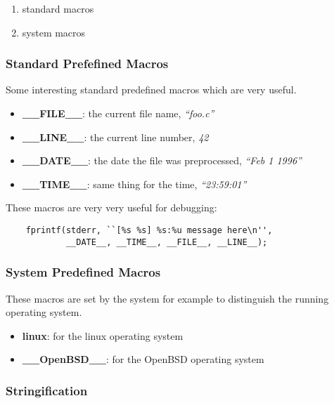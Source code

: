 {\begin{frame}
  \begin{enumerate}
    \item
      standard macros
    \item
      system macros
  \end{enumerate}
\end{frame}


\begin{frame}[containsverbatim]
  \frametitle{Standard Prefefined Macros}

  Some interesting standard predefined macros which are very useful.

  \begin{itemize}
    \item
      \textbf{\_\_FILE\_\_}: the current file name, \textit{``foo.c''}
    \item
      \textbf{\_\_LINE\_\_}: the current line number, \textit{42}
    \item
      \textbf{\_\_DATE\_\_}: the date the file was preprocessed,
      \textit{``Feb 1 1996''}
    \item
      \textbf{\_\_TIME\_\_}: same thing for the time, \textit{``23:59:01''}
  \end{itemize}

  These macros are very very useful for debugging:

  \begin{verbatim}
    fprintf(stderr, ``[%s %s] %s:%u message here\n'', 
            __DATE__, __TIME__, __FILE__, __LINE__);
  \end{verbatim}
\end{frame}


\begin{frame}
  \frametitle{System Predefined Macros}

  These macros are set by the system for example to distinguish the
  running operating system.

  \begin{itemize}[<+->]
    \item
      \textbf{linux}: for the linux operating system
    \item
      \textbf{\_\_OpenBSD\_\_}: for the OpenBSD operating system
  \end{itemize}
\end{frame}


\begin{frame}
  \frametitle{Stringification}


\end{frame}}

